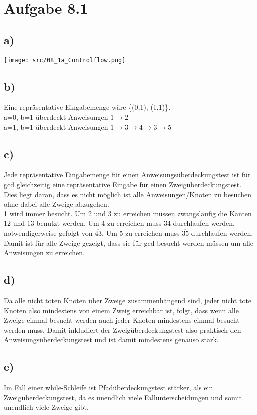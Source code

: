 \documentclass[a4paper,11pt]{scrartcl}
\begin{document}
		
	\section*{Aufgabe 8.1}
	\subsection*{a)}
        \texttt{[image: src/08\_1a\_Controlflow.png]}
	\subsection*{b)}
		Eine repräsentative Eingabemenge wäre \{(0,1), (1,1)\}.\\
	    a=0, b=1 überdeckt Anweisungen $1\rightarrow 2$\\
	    a=1, b=1 überdeckt Anweisungen $1\rightarrow 3 \rightarrow 4 \rightarrow 3 \rightarrow 5$
	\subsection*{c)}
	    Jede repräsentative Eingabemenge für einen Anweisungsüberdeckungstest ist für gcd gleichzeitig eine repräsentative Eingabe für einen Zweigüberdeckungstest. Dies liegt daran, dass es nicht möglich ist alle Anweisungen/Knoten zu besuchen ohne dabei alle Zweige abzugehen. \\
	    1 wird immer besucht. Um 2 und 3 zu erreichen müssen zwangsläufig die Kanten $\overline{12}$ und $\overline{13}$ benutzt werden. Um 4 zu erreichen muss $\overline{34}$ durchlaufen werden, notwendigerweise gefolgt von $\overline{43}$. Um 5 zu erreichen muss $\overline{35}$ durchlaufen werden. Damit ist für alle Zweige gezeigt, dass sie für gcd besucht werden müssen um alle Anweisungen zu erreichen. 
	\subsection*{d)}
	    Da alle nicht toten Knoten über Zweige zusammenhängend sind, jeder nicht tote Knoten also mindestens von einem Zweig erreichbar ist, folgt, dass wenn alle Zweige einmal besucht werden auch jeder Knoten mindestens einmal besucht werden muss. Damit inkludiert der Zweigüberdeckungstest also praktisch den Anweisungsüberdeckungstest und ist damit mindestens genauso stark.
	\subsection*{e)}
	    Im Fall einer while-Schleife ist Pfadüberdeckungstest stärker, als ein Zweigüberdeckungstest, da es unendlich viele Fallunterscheidungen und somit unendlich viele Zweige gibt.    
\end{document}
